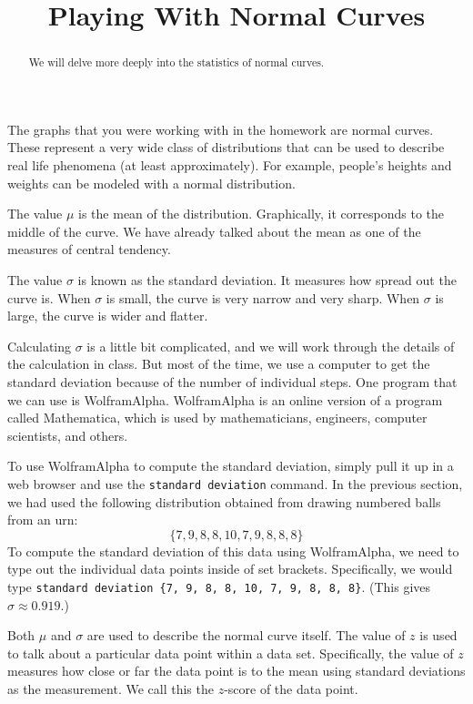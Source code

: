 \documentclass{ximera}
\title{Playing With Normal Curves}
\begin{document}
\begin{abstract}
We will delve more deeply into the statistics of normal curves.
\end{abstract}
\maketitle

The graphs that you were working with in the homework are normal curves.  These represent a very wide class of distributions that can be used to describe real life phenomena (at least approximately). For example, people's heights and weights can be modeled with a normal distribution.

The value $\mu$ is the mean of the distribution. Graphically, it corresponds to the middle of the curve. We have already talked about the mean as one of the measures of central tendency.

The value $\sigma$ is known as the standard deviation. It measures how spread out the curve is. When $\sigma$ is small, the curve is very narrow and very sharp. When $\sigma$ is large, the curve is wider and flatter.

Calculating $\sigma$ is a little bit complicated, and we will work through the details of the calculation in class. But most of the time, we use a computer to get the standard deviation because of the number of individual steps. One program that we can use is WolframAlpha. WolframAlpha is an online version of a program called Mathematica, which is used by mathematicians, engineers, computer scientists, and others.

To use WolframAlpha to compute the standard deviation, simply pull it up in a web browser and use the \verb|standard deviation| command. In the previous section, we had used the following distribution obtained from drawing numbered balls from an urn:
\[ \{ 7, 9, 8, 8, 10, 7, 9, 8, 8, 8 \} \]
To compute the standard deviation of this data using WolframAlpha, we need to type out the individual data points inside of set brackets. Specifically, we would type \verb|standard deviation {7, 9, 8, 8, 10, 7, 9, 8, 8, 8}|. (This gives $\sigma \approx 0.919$.)

Both $\mu$ and $\sigma$ are used to describe the normal curve itself. The value of $z$ is used to talk about a particular data point within a data set. Specifically, the value of $z$ measures how close or far the data point is to the mean using standard deviations as the measurement. We call this the $z$-score of the data point.
\end{document}
